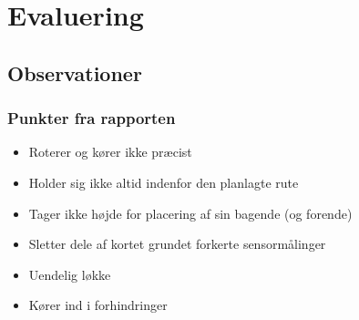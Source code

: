\section{Evaluering}

\subsection{Observationer}

\begin{frame}
\frametitle{Punkter fra rapporten}
\begin{itemize}
\item Roterer og kører ikke præcist
\item Holder sig ikke altid indenfor den planlagte rute
\item Tager ikke højde for placering af sin bagende (og forende)
\item Sletter dele af kortet grundet forkerte sensormålinger
\item Uendelig løkke
\item Kører ind i forhindringer
\end{itemize}
\end{frame}